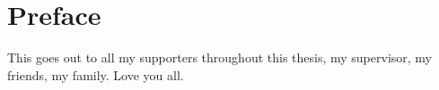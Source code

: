 \chapter*{Preface}\label{chapter:preface}

This goes out to all my supporters throughout this thesis, my supervisor, my friends, my family. Love you all. 
